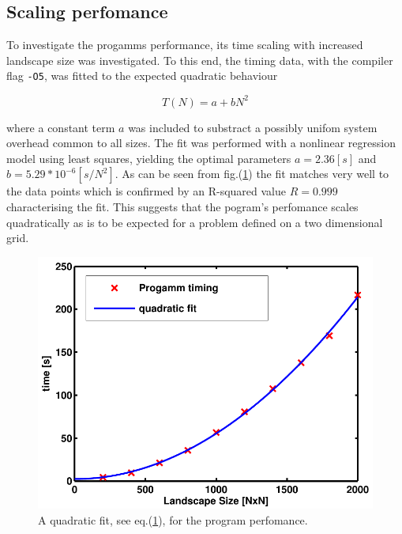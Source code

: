\subsection{Scaling perfomance}
\label{subsec:scaling pefomance}

To investigate the progamms performance, its time scaling with increased landscape size was investigated.
To this end, the timing data, with the compiler flag  \texttt{-O5}, was fitted to the expected quadratic behaviour

\begin{equation}
 T(N)=a+bN^2
\label{eq:fitting curve}
\end{equation}

where a constant term $a$ was included to substract a possibly unifom system overhead common to all sizes.
The fit was performed with a nonlinear regression model using least squares, yielding the optimal parameters $a=2.36 [s]$ and $b=5.29*10^{-6} [s/N^2]$.
As can be seen from fig.(\ref{fig:fitting curve}) the fit matches very well to the data points which is confirmed by an R-squared value $R=0.999$ characterising the fit.
This suggests that the pogram's perfomance scales quadratically as is to be expected for a problem defined on a two dimensional grid. 

\begin{figure}
 \includegraphics{Figures/TimingFitO5.pdf}
\caption{A quadratic fit, see eq.(\ref{fig:fitting curve}), for the program perfomance.}
\label{fig:fitting curve}
\end{figure}




 



